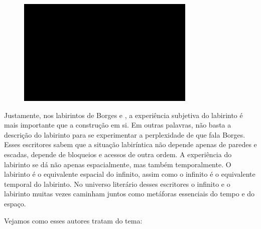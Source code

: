 \begin{figure}[!ht]

\centering
 \includegraphics[width=85mm]{./imgs/im1.jpg}
\caption{\tiny{}}

\end{figure}

Justamente, nos labirintos de Borges e , a experiência subjetiva do
labirinto é mais importante que a construção em si. Em outras palavras,
não basta a descrição do labirinto para se experimentar a perplexidade
de que fala Borges. Esses escritores sabem que a situação labiríntica
não depende apenas de paredes e escadas, depende de bloqueios e acessos
de outra ordem. A experiência do labirinto se dá não apenas
espacialmente, mas também temporalmente. O labirinto é o equivalente
espacial do infinito, assim como o infinito é o equivalente temporal do
labirinto. No universo literário desses escritores o infinito e o
labirinto muitas vezes caminham juntos como metáforas essenciais do
tempo e do espaço.

Vejamos como esses autores tratam do tema:


